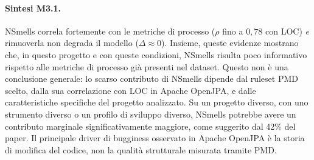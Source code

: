 \paragraph{Sintesi M3.1.}
NSmells correla fortemente con le metriche di processo ($\rho$ fino a $0{,}78$ con LOC)
\textit{e} rimuoverla non degrada il modello ($\Delta \approx 0$). Insieme, queste evidenze
mostrano che, in questo progetto e con queste condizioni, NSmells risulta poco informativo
rispetto alle metriche di processo già presenti nel dataset. Questo non è una conclusione
generale: lo scarso contributo di NSmells dipende dal ruleset PMD scelto, dalla sua
correlazione con LOC in Apache OpenJPA, e dalle caratteristiche specifiche del progetto
analizzato. Su un progetto diverso, con uno strumento diverso o un profilo di sviluppo
diverso, NSmells potrebbe avere un contributo marginale significativamente maggiore,
come suggerito dal 42\% del paper. Il principale driver di bugginess osservato in
Apache OpenJPA è la storia di modifica del codice, non la qualità strutturale misurata
tramite PMD.
